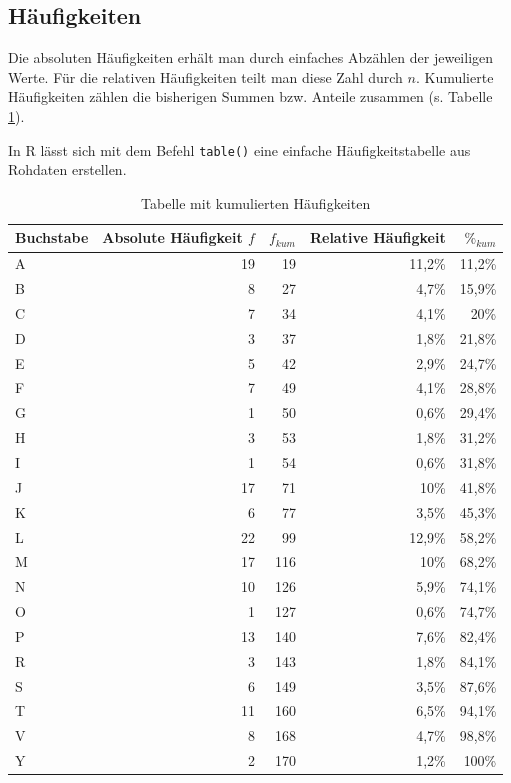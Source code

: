 \documentclass[
  11pt,
  ngerman,
  a4paper,
]{report}
\newenvironment{rtip}{
  \medskip
  \begin{tcolorbox}[colframe=purple,colback=light_gray,title=Softwarehinweis]
}{
  \end{tcolorbox}
  \medskip
}
\begin{document}
\hypertarget{huxe4ufigkeiten}{%
\subsection{Häufigkeiten}\label{huxe4ufigkeiten}}

Die absoluten Häufigkeiten erhält man durch einfaches Abzählen der jeweiligen Werte. Für die relativen Häufigkeiten teilt man diese Zahl durch \(n\). Kumulierte Häufigkeiten zählen die bisherigen Summen bzw. Anteile zusammen (s. Tabelle \ref{tab:haeufkum}).

\begin{rtip}
In R lässt sich mit dem Befehl \verb|table()| eine einfache Häufigkeitstabelle aus Rohdaten erstellen.
\end{rtip}

\begin{table}

\caption{\label{tab:haeufkum}Tabelle mit kumulierten Häufigkeiten}
\centering
\begin{tabular}[t]{lrrrr}
\toprule
Buchstabe & Absolute Häufigkeit $f$ & $f_{kum}$ & Relative Häufigkeit & $\%_{kum}$\\
\midrule
A & 19 & 19 & 11,2\% & 11,2\%\\
B & 8 & 27 & 4,7\% & 15,9\%\\
C & 7 & 34 & 4,1\% & 20\%\\
D & 3 & 37 & 1,8\% & 21,8\%\\
E & 5 & 42 & 2,9\% & 24,7\%\\
F & 7 & 49 & 4,1\% & 28,8\%\\
G & 1 & 50 & 0,6\% & 29,4\%\\
H & 3 & 53 & 1,8\% & 31,2\%\\
I & 1 & 54 & 0,6\% & 31,8\%\\
J & 17 & 71 & 10\% & 41,8\%\\
K & 6 & 77 & 3,5\% & 45,3\%\\
L & 22 & 99 & 12,9\% & 58,2\%\\
M & 17 & 116 & 10\% & 68,2\%\\
N & 10 & 126 & 5,9\% & 74,1\%\\
O & 1 & 127 & 0,6\% & 74,7\%\\
P & 13 & 140 & 7,6\% & 82,4\%\\
R & 3 & 143 & 1,8\% & 84,1\%\\
S & 6 & 149 & 3,5\% & 87,6\%\\
T & 11 & 160 & 6,5\% & 94,1\%\\
V & 8 & 168 & 4,7\% & 98,8\%\\
Y & 2 & 170 & 1,2\% & 100\%\\
\bottomrule
\end{tabular}
\end{table}
\end{document}
